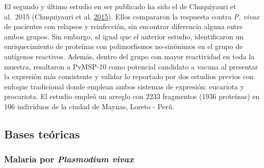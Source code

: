 \documentclass[
  a4paper]{article}
\begin{document}
\begin{enumerate}
  El segundo y último estudio en ser publicado ha sido el de Chuquiyauri
  et al.~2015 (Chuquiyauri et al.
  \protect\hyperlink{ref-chuquiyauri2015vivax}{2015}). Ellos compararon
  la respuesta contra \emph{P. vivax} de pacientes con relapsos y
  reinfección, sin encontrar diferencia alguna entre ambos grupos. Sin
  embargo, al igual que el anterior estudio, identificaron un
  enriquecimiento de proteínas con polimorfismos no-sinónimos en el
  grupo de antígenos reactivos. Además, dentro del grupo con mayor
  reactividad en toda la muestra, resaltaron a PvMSP-10 como potencial
  candidato a vacuna al presentar la expresión más consistente y validar
  lo reportado por dos estudios previos con enfoque tradicional donde
  emplean ambos sistemas de expresión: eucariota y procariota. El
  estudio empleó un arreglo con 2233 fragmentos (1936 proteínas) en 106
  individuos de la ciudad de Maynas, Loreto - Perú.
\end{enumerate}

\hypertarget{bases-teuxf3ricas}{%
\subsection{Bases teóricas}\label{bases-teuxf3ricas}}

\hypertarget{malaria-por-plasmodium-vivax}{%
\subsubsection{\texorpdfstring{Malaria por \emph{Plasmodium
vivax}}{Malaria por Plasmodium vivax}}\label{malaria-por-plasmodium-vivax}}
\end{document}
